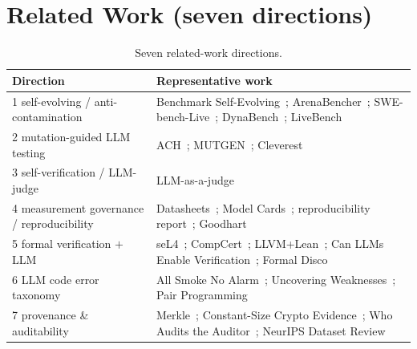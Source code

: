 \documentclass{article}
\begin{document}
\section{Related Work (seven directions)}
\label{app:related}
\begin{table}[h]
\caption{Seven related-work directions.}
\centering
\small
\begin{tabular}{@{}lp{10.5cm}@{}}
\toprule
Direction & Representative work \\
\midrule
1 self-evolving / anti-contamination & Benchmark Self-Evolving~\cite{wang2024benchmarkevolving}; ArenaBencher~\cite{liu2025arenabencher}; SWE-bench-Live~\cite{zhang2025swebenchlive}; DynaBench~\cite{kiela2021dynabench}; LiveBench~\cite{white2024livebench} \\
2 mutation-guided LLM testing & ACH~\cite{foster2025ach}; MUTGEN~\cite{wang2025mutgen}; Cleverest~\cite{liu2025cleverest} \\
3 self-verification / LLM-judge & LLM-as-a-judge~\cite{zheng2023judging} \\
4 measurement governance / reproducibility & Datasheets~\cite{gebru2021datasheets}; Model Cards~\cite{mitchell2019modelcards}; reproducibility report~\cite{pineau2021improving}; Goodhart~\cite{goodhart1975problems,strathern1997improving} \\
5 formal verification $+$ LLM & seL4~\cite{klein2009sel4}; CompCert~\cite{leroy2009compcert}; LLVM+Lean~\cite{liao2026llvmlean}; Can LLMs Enable Verification~\cite{shefer2025canllms}; Formal Disco~\cite{poesia2026formaldisco} \\
6 LLM code error taxonomy & All Smoke No Alarm~\cite{banik2026allsmoke}; Uncovering Weaknesses~\cite{lian2024uncovering}; Pair Programming~\cite{lyu2025pairprogramming} \\
7 provenance \& auditability & Merkle~\cite{merkle1988digital}; Constant-Size Crypto Evidence~\cite{kao2025constantsize}; Who Audits the Auditor~\cite{wang2026whoaudits}; NeurIPS Dataset Review~\cite{wu2024neurips} \\
\bottomrule
\end{tabular}
\end{table}
\end{document}
